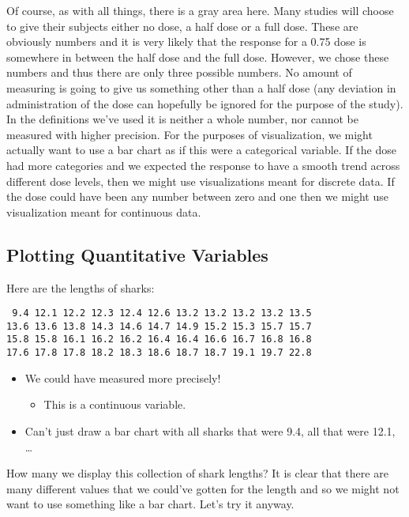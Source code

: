 \documentclass[
  letterpaper,
  DIV=11,
  numbers=noendperiod]{scrreprt}
\providecommand{\tightlist}{%
  \setlength{\itemsep}{0pt}\setlength{\parskip}{0pt}}\usepackage{longtable,booktabs,array}
\begin{document}
Of course, as with all things, there is a gray area here. Many studies
will choose to give their subjects either no dose, a half dose or a full
dose. These are obviously numbers and it is very likely that the
response for a 0.75 dose is somewhere in between the half dose and the
full dose. However, we chose these numbers and thus there are only three
possible numbers. No amount of measuring is going to give us something
other than a half dose (any deviation in administration of the dose can
hopefully be ignored for the purpose of the study). In the definitions
we've used it is neither a whole number, nor cannot be measured with
higher precision. For the purposes of visualization, we might actually
want to use a bar chart as if this were a categorical variable. If the
dose had more categories and we expected the response to have a smooth
trend across different dose levels, then we might use visualizations
meant for discrete data. If the dose could have been any number between
zero and one then we might use visualization meant for continuous data.

\hypertarget{plotting-quantitative-variables}{%
\subsection{Plotting Quantitative
Variables}\label{plotting-quantitative-variables}}

Here are the lengths of sharks:

\begin{verbatim}
 9.4 12.1 12.2 12.3 12.4 12.6 13.2 13.2 13.2 13.2 13.5
13.6 13.6 13.8 14.3 14.6 14.7 14.9 15.2 15.3 15.7 15.7
15.8 15.8 16.1 16.2 16.2 16.4 16.4 16.6 16.7 16.8 16.8
17.6 17.8 17.8 18.2 18.3 18.6 18.7 18.7 19.1 19.7 22.8
\end{verbatim}

\begin{itemize}
\tightlist
\item
  We could have measured more precisely!

  \begin{itemize}
  \tightlist
  \item
    This is a continuous variable.
  \end{itemize}
\item
  Can't just draw a bar chart with all sharks that were 9.4, all that
  were 12.1, \ldots{}
\end{itemize}

How many we display this collection of shark lengths? It is clear that
there are many different values that we could've gotten for the length
and so we might not want to use something like a bar chart. Let's try it
anyway.
\end{document}
